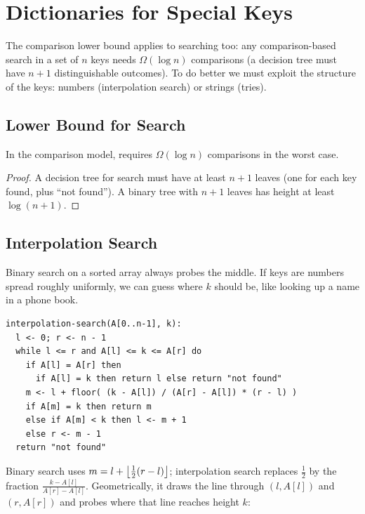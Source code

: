 \chapter{Dictionaries for Special Keys}


The comparison lower bound applies to searching too: any comparison-based search
in a set of $n$ keys needs $\Omega(\log n)$ comparisons (a decision tree must
have $n + 1$ distinguishable outcomes). To do better we must exploit the
structure of the keys: numbers (interpolation search) or strings (tries).

\section{Lower Bound for Search}

\begin{theorem}
In the comparison model,  requires $\Omega(\log n)$ comparisons in
the worst case.
\end{theorem}
\begin{proof}
A decision tree for search must have at least $n + 1$ leaves (one for each
key found, plus ``not found''). A binary tree with $n + 1$ leaves has height at
least $\log(n+1)$.
\end{proof}

\section{Interpolation Search}

Binary search on a sorted array always probes the middle. If keys are numbers
spread roughly uniformly, we can guess where $k$ should be, like looking up a
name in a phone book.

\begin{lstlisting}
interpolation-search(A[0..n-1], k):
  l <- 0; r <- n - 1
  while l <= r and A[l] <= k <= A[r] do
    if A[l] = A[r] then
      if A[l] = k then return l else return "not found"
    m <- l + floor( (k - A[l]) / (A[r] - A[l]) * (r - l) )
    if A[m] = k then return m
    else if A[m] < k then l <- m + 1
    else r <- m - 1
  return "not found"
\end{lstlisting}

Binary search uses $m = l + \left\lfloor \frac12 (r - l) \right\rfloor$; interpolation search
replaces $\frac12$ by the fraction $\frac{k - A[l]}{A[r] - A[l]}$.
Geometrically, it draws the line through $(l, A[l])$ and $(r, A[r])$ and probes
where that line reaches height $k$:


